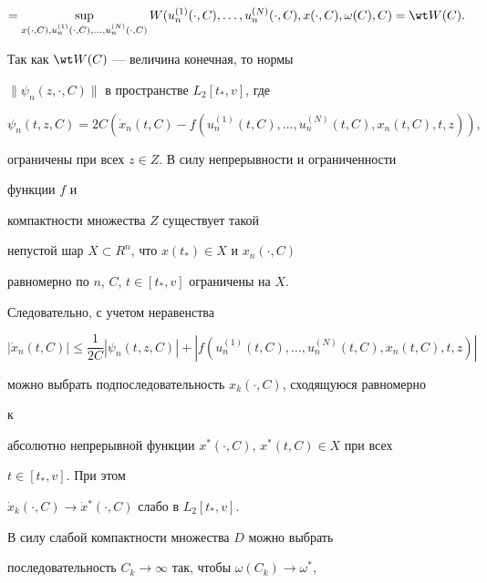 \begin{pf}
\begin{multline*}
=\sup_{x(\cdot,C),u^{(1)}_n(\cdot,C),\dotsc, 


u^{(N)}_n(\cdot,C)}W 


(u^{(1)}_n(\cdot,C),\dotsc,u^{(N)}_n(\cdot,C),x(\cdot,C), 


\omega(C),C)=\wt W(C).


\end{multline*} 


 


Так как $\wt W(C)$ --- величина конечная, то нормы 


$\|\psi_n(z,\cdot,C)\|$ в пространстве $L_2[t_*,v]$, где 


$$ 


\psi_n(t,z,C)=2C(\Dot x_n(t,C)-f 


(u^{(1)}_n(t,C),\dotsc,u^{(N)}_n(t,C), 


x_n(t,C),t,z)), 


$$ 


ограничены при всех $z\in Z$. В силу непрерывности и ограниченности 


функции $f$ и 


компактности множества $Z$ существует такой 


непустой шар $X\subset R^n$, что $x(t_*)\in X$ и $x_n(\cdot,C)$ 


равномерно по $n$, $C$, $t\in[t_*,v]$ ограничены на $X$. 


 


Следовательно, с учетом неравенства 


$$ 


|\Dot x_n(t,C)|\le\frac{1}{2C}|\psi_n(t,z,C)|+ 


|f(u^{(1)}_n(t,C),\dotsc,u^{(N)}_n(t,C),x_n(t,C),t,z)| 


$$ 


можно выбрать подпоследовательность $x_k(\cdot,C)$, сходящуюся равномерно 


к 


абсолютно непрерывной функции $x^*(\cdot,C)$, $x^*(t,C)\in X$ при всех 


$t\in[t_*,v]$. При этом 


$\Dot x_k(\cdot,C)\to\Dot x{}^*(\cdot,C)$ слабо в $L_2[t_*,v]$. 


 


В силу слабой компактности множества $D$ можно выбрать 


последовательность $C_k\to\infty$ так, чтобы $\omega(C_k)\to\omega^*$, 



\end{pf}
